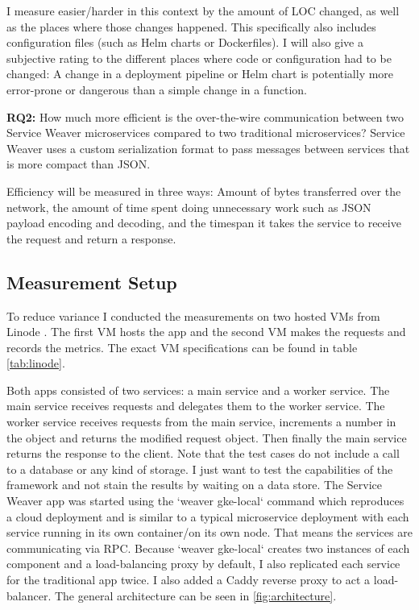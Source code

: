 \documentclass[sigconf,review,9pt]{acmart}
\begin{document}
I measure easier/harder in this context by the amount of LOC changed, as well
as the places where those changes happened.
This specifically also includes configuration files (such as Helm charts or Dockerfiles).
I will also give a subjective rating to the different places where code
or configuration had to be changed: A change in a deployment pipeline
or Helm chart is potentially more error-prone or dangerous than a simple
change in a function.

\textbf{RQ2:} How much more efficient is the over-the-wire communication between two Service Weaver
microservices compared to two traditional microservices?
Service Weaver uses a custom serialization format to pass messages between services
that is more compact than JSON.

Efficiency will be measured in three ways: Amount of bytes transferred over
the network, the amount of time spent doing unnecessary work such as
JSON payload encoding and decoding, and the timespan it takes the
service to receive the request and return a response.

\subsection{Measurement Setup}

To reduce variance I conducted the measurements on two hosted VMs from Linode \cite{Linode}.
The first VM hosts the app and the second VM makes the requests and records the
metrics.
The exact VM specifications can be found in table \ref{tab:linode}.

Both apps consisted of two services: a main service and a worker service.
The main service receives requests and delegates them to the worker service.
The worker service receives requests from the main service, increments a number in the object
and returns the modified request object.
Then finally the main service returns the response to the client.
Note that the test cases do not include a call to a database or any kind of storage.
I just want to test the capabilities of the framework and not stain the results by
waiting on a data store.
The Service Weaver app was started using the `weaver gke-local` command which reproduces a
cloud deployment and is similar to a typical microservice deployment with each service running in
its own container/on its own node.
That means the services are communicating via RPC.
Because `weaver gke-local` creates two instances of each component and a load-balancing
proxy by default, I also replicated each service for the traditional app twice.
I also added a Caddy \cite{serverCaddyUltimateServer} reverse proxy to act a load-balancer.
The general architecture can be seen in \ref{fig:architecture}.
\end{document}
